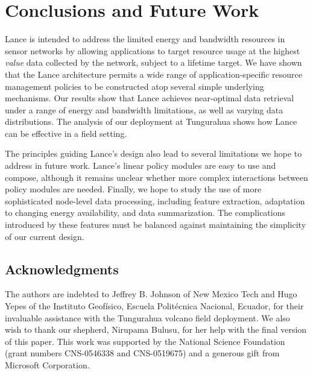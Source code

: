 \section{Conclusions and Future Work}
\label{lance-sec-conclusions}
\label{lance-sec-conclusion}
\label{lance-sec-future}
\label{lance-sec-futurework}

Lance is intended to address the limited energy and bandwidth resources in
sensor networks by allowing applications to target resource usage at the
highest {\em value} data collected by the network, subject to a lifetime
target.  We have shown that the Lance architecture permits a wide range of
application-specific resource management policies to be constructed atop
several simple underlying mechanisms. Our results show that Lance achieves
near-optimal data retrieval under a range of energy and bandwidth
limitations, as well as varying data distributions. The analysis of our
deployment at Tungurahua shows how Lance can be effective in a field
setting. 

The principles guiding Lance's design also lead to several limitations we
hope to address in future work.  Lance's linear policy modules are easy to
use and compose, although it remains unclear whether more complex
interactions between policy modules are needed. Finally, we hope to study the
use of more sophisticated node-level data processing, including feature
extraction, adaptation to changing energy availability, and data
summarization.  The complications introduced by these features must be
balanced against maintaining the simplicity of our current design.

\subsection*{Acknowledgments}

The authors are indebted to Jeffrey B. Johnson of New Mexico Tech and 
Hugo Yepes of the Instituto Geof\'{i}sico, Escuela Polit\'{e}cnica
Nacional, Ecuador, for their invaluable assistance with the Tungurahua 
volcano field deployment. We also wish to thank our shepherd, Nirupama
Bulusu, for her help with the final version of this paper. This work was 
supported by the National Science Foundation (grant numbers CNS-0546338 
and CNS-0519675) and a generous gift from Microsoft Corporation.

